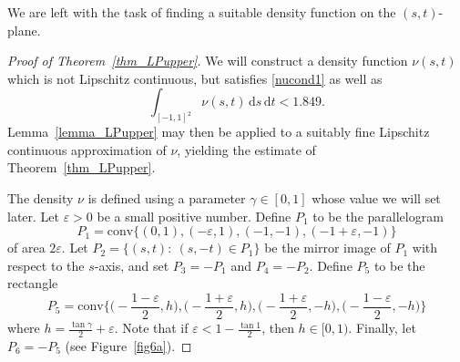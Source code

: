 \documentclass[11pt,a4paper]{amsart}
\newcommand{\eps}{\varepsilon}
\newcommand{\dd}{\,\mathrm{d}}
\begin{document}
We are left with the task of finding a suitable density function on the $(s,t)$-plane.

\begin{proof}[Proof of Theorem~\ref{thm_LPupper}]
We will construct a density function $\nu(s,t)$ which is not Lipschitz continuous, but satisfies \eqref{nucond1} as well as
\begin{equation}\label{nuint1849}
   \int_{[-1,1]^2} \nu(s,t) \dd s \dd t < 1.849.
\end{equation}
Lemma~\ref{lemma_LPupper} may then be applied to a suitably fine Lipschitz continuous approximation of $\nu$, yielding the estimate of Theorem~\ref{thm_LPupper}.

The density $\nu$ is defined using a parameter $\gamma \in [0,1]$ whose value we will set later.
Let $\eps>0$ be a small positive number. Define $P_1$ to be the parallelogram
\[
P_1 = \mathrm{conv}\{(0,1), (-\eps, 1), (-1, -1), (-1 + \eps, -1 )\}
\]
of area  $2 \eps$.
Let $P_2 = \{(s, t):\ (s, -t) \in P_1\}$ be the mirror image of $P_1$ with respect to the $s$-axis, and set $P_3 = - P_1$ and $P_4 = -P_2$.
Define $P_5$ to be the rectangle
\[
P_5 = \mathrm{conv}\Big \{\Big(- \frac {1 - \eps} {2}, h \Big), \Big(- \frac {1 + \eps} {2}, h \Big),\Big(- \frac {1 + \eps} {2}, -h \Big), \Big(- \frac {1 - \eps} {2}, -h \Big) \Big \}
\]
where $h = \frac {\tan \gamma  }{2}  + \eps$. Note that if $\eps< 1 - \frac{\tan 1}{2}$, then $h\in[0,1)$. Finally, let $P_6 = - P_5$ (see Figure~\ref{fig6a}).




\end{proof}
\end{document}
